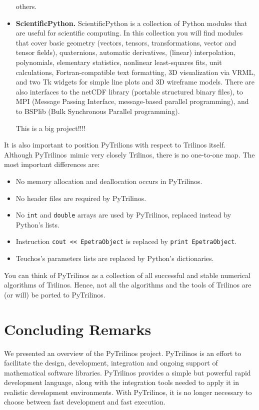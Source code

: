 \documentclass[10pt,relax]{SANDreport}
\newcommand{\PyTrilinos}{{PyTrilinos}}
\newcommand{\teuchos}{{Teuchos}}
\begin{document}
\begin{itemize}
others.
%
\item {\bf ScientificPython.} 
ScientificPython is a collection of Python modules that are useful for
scientific computing. In this collection you will find modules that cover
basic geometry (vectors, tensors, transformations, vector and tensor fields),
  quaternions, automatic derivatives, (linear) interpolation, polynomials,
  elementary statistics, nonlinear least-squares fits, unit calculations,
  Fortran-compatible text formatting, 3D visualization via VRML, and two Tk
  widgets for simple line plots and 3D wireframe models. There are also
  interfaces to the netCDF library (portable structured binary files), to MPI
  (Message Passing Interface, message-based parallel programming), and to
  BSPlib (Bulk Synchronous Parallel programming).

  This is a big project!!!!
\end{itemize}

It is also important to position PyTrilions with respect to Trilinos itself.
Although \PyTrilinos\ mimic very closely Trilinos, there is no one-to-one
map. The most important differences are:
\begin{itemize}
\item No memory allocation and deallocation occurs in PyTrilinos.
\item No header files are required by PyTrilinos.
\item No {\tt int} and {\tt double} arrays are used by PyTrilinos, replaced instead by
Python's lists.
\item Instruction \verb!cout << EpetraObject! is replaced by \verb!print EpetraObject!.
\item \teuchos's parameters lists are replaced by Python's dictionaries.
\end{itemize}

You
can think of PyTrilinos as a collection of all successful and stable
numerical algorithms of Trilinos.  Hence, not all the algorithms and the tools
of Trilinos are (or will) be ported to PyTrilinos. 

%
\section{Concluding Remarks}
\label{sec:concluding}

We presented an overview of the PyTrilinos project. PyTrilinos is an effort to
facilitate the design, development, integration and ongoing support of
mathematical software libraries.  PyTrilinos provides a simple but powerful
rapid development language, along with the integration tools needed to apply
it in realistic development environments. With PyTrilinos, it is no longer
necessary to choose between fast development and fast execution.
\end{document}

